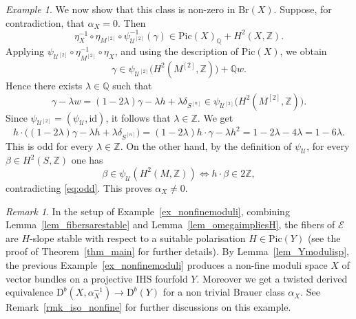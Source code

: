 \documentclass[12pt,a4paper]{amsart}
\theoremstyle{plain}
\theoremstyle{definition}
\theoremstyle{remark}
\newtheorem{example}[thm]{Example}
\newtheorem{rmk}[thm]{Remark}
\def\Pic{\mathrm{Pic}}
\def\Z{\mathbb{Z}}
\def\QQ{\mathbb{Q}}
\newcommand{\D}{\mathrm{D}^b}
\newcommand{\Br}{\mathrm{Br}}
\newcommand{\rathodge}[1]{\psi_{#1}}
\begin{document}
\begin{example}
\noindent We now show that this class is non-zero in $\Br(X)$. Suppose, for contradiction, that $\alpha_X=0$. Then
\begin{equation*}
    \eta_X^{-1}\circ\eta_{M^{[2]}}\circ\rathodge{\mathcal{U}^{[2]}}^{-1}(\gamma)\in\Pic(X)_\QQ+H^2(X,\Z).
\end{equation*}
Applying $\rathodge{\mathcal{U}^{[2]}}\circ\eta_{M^{[2]}}^{-1}\circ\eta_X$, and using the description of $\Pic(X)$, we obtain
\[
   \gamma\in \rathodge{\mathcal{U}^{[2]}}\bigl(H^2(M^{[2]},\Z)\bigr)+\QQ w.
\]
Hence there exists $\lambda\in\QQ$ such that
\begin{equation*}
   \gamma-\lambda w=(1-2\lambda)\gamma-\lambda h+\lambda\delta_{S^{[n]}}\in \rathodge{\mathcal{U}^{[2]}}\bigl(H^2(M^{[2]},\Z)\bigr).
\end{equation*}
\noindent Since $\rathodge{\mathcal{U}^{[2]}}=(\rathodge{\mathcal{U}},\mathrm{id})$, it follows that $\lambda\in\Z$.
We get
\begin{equation}\label{eq:odd}
   h\cdot\bigl((1-2\lambda)\gamma-\lambda h+\lambda\delta_{S^{[n]}}\bigr)
   =(1-2\lambda)h\cdot\gamma-\lambda h^2
   =1-2\lambda-4\lambda
   =1-6\lambda.
\end{equation}
This is odd for every $\lambda\in\Z$. On the other hand, by the definition of $\rathodge{\mathcal{U}}$, for every $\beta\in H^2(S,\mathbb{Z})$ one has
\begin{equation*}
    \beta\in \rathodge{\mathcal{U}}(H^2(M,\mathbb{Z}))\iff h\cdot\beta\in 2\mathbb{Z},
\end{equation*}
contradicting \eqref{eq:odd}. This proves $\alpha_X\neq 0$.
\end{example}
\begin{rmk}\label{rmk_nonfinemoduli}
    In the setup of Example~\ref{ex_nonfinemoduli}, combining Lemma~\ref{lem_fibersarestable} and Lemma~\ref{lem_omegaimpliesH}, the fibers of $\mathcal{E}$ are $H$-slope stable with respect to a suitable polarisation $H\in\Pic(Y)$ (see the proof of Theorem~\ref{thm_main} for further details). 
    By Lemma~\ref{lem_Ymodulisp}, the previous Example~\ref{ex_nonfinemoduli} produces a non-fine moduli space $X$ of vector bundles on a projective IHS fourfold $Y$. 
    Moreover we get a twisted derived equivalence $\D(X,\alpha_X^{-1})\to \D(Y)$ for a non trivial Brauer class $\alpha_X$. See Remark~\ref{rmk_iso_nonfine} for further discussions on this example.
\end{rmk}
\end{document}
